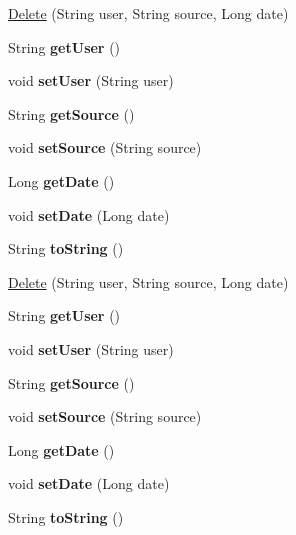\begin{DoxyCompactItemize}
\item 
\hyperlink{class_delete_acb6bc707d28650bdeb2283f87630e0b6}{Delete} (String user, String source, Long date)
\item 
\mbox{\label{class_delete_a127124607f6d882f87a4deabc2a95e33}} 
String {\bfseries get\+User} ()
\item 
\mbox{\label{class_delete_a1154a1eb8b05320cf686691cd727dc50}} 
void {\bfseries set\+User} (String user)
\item 
\mbox{\label{class_delete_acc45fccf90716ebcd88990f0c6c36d43}} 
String {\bfseries get\+Source} ()
\item 
\mbox{\label{class_delete_a2bddae4762dd4231ab53ee8b2409130b}} 
void {\bfseries set\+Source} (String source)
\item 
\mbox{\label{class_delete_a65c0b139726126a7c0a0bfef168bbe84}} 
Long {\bfseries get\+Date} ()
\item 
\mbox{\label{class_delete_ae1062b901bae5ee6d6722448a12af7aa}} 
void {\bfseries set\+Date} (Long date)
\item 
\mbox{\label{class_delete_ab39433411917f38404d915307d826600}} 
String {\bfseries to\+String} ()
\item 
\hyperlink{class_delete_acb6bc707d28650bdeb2283f87630e0b6}{Delete} (String user, String source, Long date)
\item 
\mbox{\label{class_delete_a127124607f6d882f87a4deabc2a95e33}} 
String {\bfseries get\+User} ()
\item 
\mbox{\label{class_delete_a1154a1eb8b05320cf686691cd727dc50}} 
void {\bfseries set\+User} (String user)
\item 
\mbox{\label{class_delete_acc45fccf90716ebcd88990f0c6c36d43}} 
String {\bfseries get\+Source} ()
\item 
\mbox{\label{class_delete_a2bddae4762dd4231ab53ee8b2409130b}} 
void {\bfseries set\+Source} (String source)
\item 
\mbox{\label{class_delete_a65c0b139726126a7c0a0bfef168bbe84}} 
Long {\bfseries get\+Date} ()
\item 
\mbox{\label{class_delete_ae1062b901bae5ee6d6722448a12af7aa}} 
void {\bfseries set\+Date} (Long date)
\item 
\mbox{\label{class_delete_ab39433411917f38404d915307d826600}} 
String {\bfseries to\+String} ()
\end{DoxyCompactItemize}


